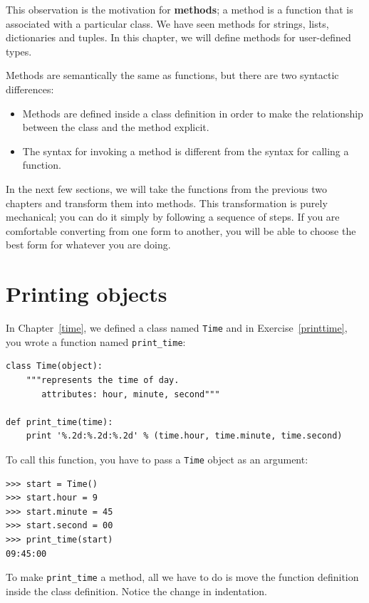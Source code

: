 \documentclass[10pt]{book}
\begin{document}

This observation is the motivation for {\bf methods}; a method is
a function that is associated with a particular class.
We have seen methods for strings, lists, dictionaries and tuples.
In this chapter, we will define methods for user-defined types.


Methods are semantically the same as functions, but there are
two syntactic differences:

\begin{itemize}

\item Methods are defined inside a class definition in order
to make the relationship between the class and the method explicit.

\item The syntax for invoking a method is different from the
syntax for calling a function.

\end{itemize}

In the next few sections, we will take the functions from the previous
two chapters and transform them into methods.  This transformation is
purely mechanical; you can do it simply by following a sequence of
steps.  If you are comfortable converting from one form to another,
you will be able to choose the best form for whatever you are doing.


\section{Printing objects}
\label{print_time}


In Chapter~\ref{time}, we defined a class named
{\tt Time} and in Exercise~\ref{printtime}, you 
wrote a function named \verb"print_time":

\beforeverb
\begin{verbatim}
class Time(object):
    """represents the time of day.
       attributes: hour, minute, second"""

def print_time(time):
    print '%.2d:%.2d:%.2d' % (time.hour, time.minute, time.second)
\end{verbatim}
\afterverb
%
To call this function, you have to pass a {\tt Time} object as an
argument:

\beforeverb
\begin{verbatim}
>>> start = Time()
>>> start.hour = 9
>>> start.minute = 45
>>> start.second = 00
>>> print_time(start)
09:45:00
\end{verbatim}
\afterverb
%
To make \verb"print_time" a method, all we have to do is
move the function definition inside the class definition.  Notice
the change in indentation.
\end{document}
